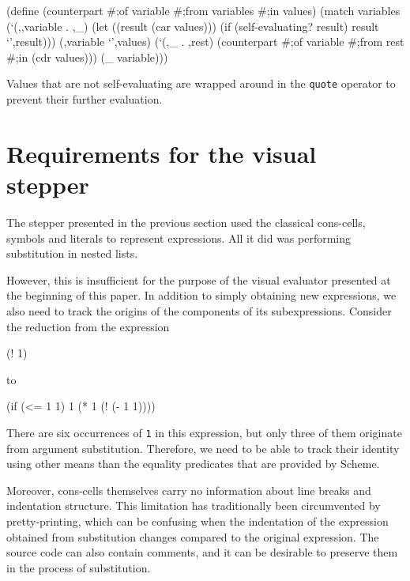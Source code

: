 \documentclass[acmsmall]{acmart}
\newenvironment{Snippet}{\Verbatim[samepage=true]}{\endVerbatim}
\begin{document}
\begin{Snippet}
(define (counterpart #;of variable #;from variables #;in values)
  (match variables
    (`(,,variable . ,_)
     (let ((result (car values)))
       (if (self-evaluating? result)
	   result
	   `',result)))
\end{Snippet}
\begin{Snippet}
    (,variable
     `',values)
\end{Snippet}
\begin{Snippet}
    (`(,_ . ,rest)
     (counterpart #;of variable #;from rest #;in (cdr values)))
\end{Snippet}
\begin{Snippet}
    (_
     variable)))
\end{Snippet}

Values that are not self-evaluating are wrapped around in the
\texttt{quote} operator to prevent their further evaluation.

\section{Requirements for the visual stepper}
\label{sec:org9359294}

The stepper presented in the previous section used the classical
cons-cells, symbols and literals to represent expressions. All it did
was performing substitution in nested lists.

However, this is insufficient for the purpose of the visual evaluator
presented at the beginning of this paper. In addition to simply obtaining
new expressions, we also need to track the origins of the components
of its subexpressions. Consider the reduction from the expression

\begin{Snippet}
(! 1)
\end{Snippet}

to

\begin{Snippet}
(if (<= 1 1)
    1
   (* 1 (! (- 1 1))))
\end{Snippet}

There are six occurrences of \texttt{1} in this expression, but only
three of them originate from argument substitution. Therefore, we need
to be able to track their identity using other means than the equality
predicates that are provided by Scheme.

Moreover, cons-cells themselves carry no information about line breaks
and indentation structure. This limitation has traditionally been
circumvented by pretty-printing, which can be confusing when the
indentation of the expression obtained from substitution changes
compared to the original expression. The source code can also contain
comments, and it can be desirable to preserve them in the process of
substitution.
\end{document}
